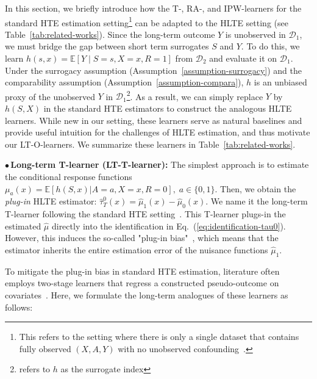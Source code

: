 \documentclass{article}
\theoremstyle{plain}
\theoremstyle{definition}
\theoremstyle{remark}
\newcommand{\E}{\mathbb{E}}                %
\newcommand{\1}{\mathds{1}}                %
\newcommand{\methods}{LT-O-learners\xspace}
\newcommand{\LTT}{LT-T-learner\xspace}
\begin{document}

In this section, we briefly introduce how the T-, RA-, and IPW-learners for the standard HTE estimation setting\footnote{This refers to the setting where there is only a single dataset that contains fully observed $(X,A,Y)$ with no unobserved confounding~\cite{Kunzel.2019}.} can be adapted to the HLTE setting (see Table~\ref{tab:related-works}). Since the long-term outcome $Y$ is unobserved in $\mathcal{D}_1$, we must bridge the gap between short term surrogates $S$ and $Y$. To do this, we learn $h(s,x) = \E[Y \mid S=s, X=x, R=1]$ from $\mathcal{D}_2$ and evaluate it on $\mathcal{D}_1$. Under the surrogacy assumption (Assumption~\ref{assumption-surrogacy}) and the comparability assumption (Assumption~\ref{assumption-compara}), $h$ is an unbiased proxy of the unobserved $Y$ in $\mathcal{D}_1$\footnote{\citet{Athey.2025} refers to $h$ as the surrogate index}. As a result, we can simply replace $Y$ by $h(S,X)$ in the standard HTE estimators to construct the analogous HLTE learners. While new in our setting, these learners serve as natural baselines and provide useful intuition for the challenges of HLTE estimation, and thus motivate our \methods. We summarize these learners in Table~\ref{tab:related-works}.

$\bullet$\,\textbf{Long-term T-learner (\LTT):} The simplest approach is to estimate the conditional response functions $\mu_a(x)=\E\left[h(S,x)|A=a, X=x,R=0\right], \;a\in\{0,1\}$. Then, we obtain the \emph{plug-in} HLTE estimator: $\hat\tau^0_{T}(x)=\hat\mu_1(x) - \hat\mu_0(x)$. We name it the long-term T-learner following the standard HTE setting~\cite{Kunzel.2019}. This T-learner plugs-in the estimated $\hat\mu$ directly into the identification in Eq.~(\ref{eq:identification-tau0}). However, this induces the so-called "plug-in bias"~\citep{Kennedy.2022-Sempiparametric}, which means that the estimator inherits the entire estimation error of the nuisance functions $\hat\mu_1$. 

To mitigate the plug-in bias in standard HTE estimation, literature often employs two-stage learners that regress a constructed pseudo-outcome on covariates~\cite{Kunzel.2019, Curth.2021}. Here, we formulate the long-term analogues of these learners as follows:
\end{document}
